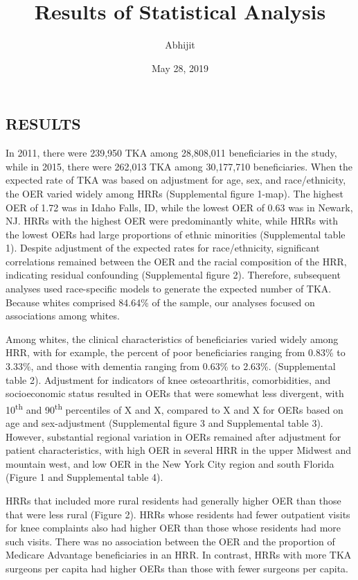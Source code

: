 \documentclass[]{article}
\title{Results of Statistical Analysis}
\author{Abhijit}
\date{May 28, 2019}
\begin{document}
\maketitle

\hypertarget{results}{%
\subsection{RESULTS}\label{results}}

In 2011, there were 239,950 TKA among 28,808,011 beneficiaries in the
study, while in 2015, there were 262,013 TKA among 30,177,710
beneficiaries. When the expected rate of TKA was based on adjustment for
age, sex, and race/ethnicity, the OER varied widely among HRRs
(Supplemental figure 1-map). The highest OER of 1.72 was in Idaho Falls,
ID, while the lowest OER of 0.63 was in Newark, NJ. HRRs with the
highest OER were predominantly white, while HRRs with the lowest OERs
had large proportions of ethnic minorities (Supplemental table 1).
Despite adjustment of the expected rates for race/ethnicity, significant
correlations remained between the OER and the racial composition of the
HRR, indicating residual confounding (Supplemental figure 2). Therefore,
subsequent analyses used race-specific models to generate the expected
number of TKA. Because whites comprised 84.64\% of the sample, our
analyses focused on associations among whites.

Among whites, the clinical characteristics of beneficiaries varied
widely among HRR, with for example, the percent of poor beneficiaries
ranging from 0.83\% to 3.33\%, and those with dementia ranging from
0.63\% to 2.63\%. (Supplemental table 2). Adjustment for indicators of
knee osteoarthritis, comorbidities, and socioeconomic status resulted in
OERs that were somewhat less divergent, with 10\textsuperscript{th} and
90\textsuperscript{th} percentiles of X and X, compared to X and X for
OERs based on age and sex-adjustment (Supplemental figure 3 and
Supplemental table 3). However, substantial regional variation in OERs
remained after adjustment for patient characteristics, with high OER in
several HRR in the upper Midwest and mountain west, and low OER in the
New York City region and south Florida (Figure 1 and Supplemental table
4).

HRRs that included more rural residents had generally higher OER than
those that were less rural (Figure 2). HRRs whose residents had fewer
outpatient visits for knee complaints also had higher OER than those
whose residents had more such visits. There was no association between
the OER and the proportion of Medicare Advantage beneficiaries in an
HRR. In contrast, HRRs with more TKA surgeons per capita had higher OERs
than those with fewer surgeons per capita.
\end{document}
